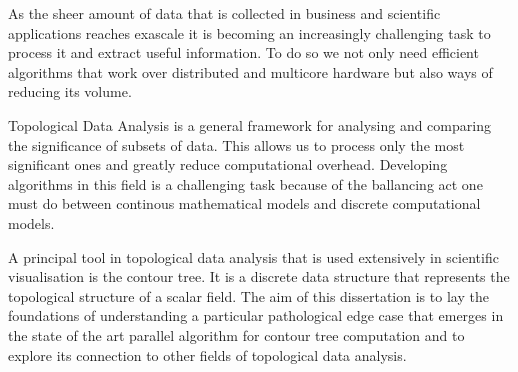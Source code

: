
As the sheer amount of data that is collected in business and scientific applications reaches exascale it is becoming an increasingly challenging task to process it and extract useful information. To do so we not only need efficient algorithms that work over distributed and multicore hardware but also ways of reducing its volume.

Topological Data Analysis is a general framework for analysing and comparing the significance of subsets of data. This allows us to process only the most significant ones and greatly reduce computational overhead. Developing algorithms in this field is a challenging task because of the ballancing act one must do between continous mathematical models and discrete computational models.

A principal tool in topological data analysis that is used extensively in scientific visualisation is the contour tree. It is a discrete data structure that represents the topological structure of a scalar field. The aim of this dissertation is to lay the foundations of understanding a particular pathological edge case that emerges in the state of the art parallel algorithm for contour tree computation and to explore its connection to other fields of topological data analysis.
